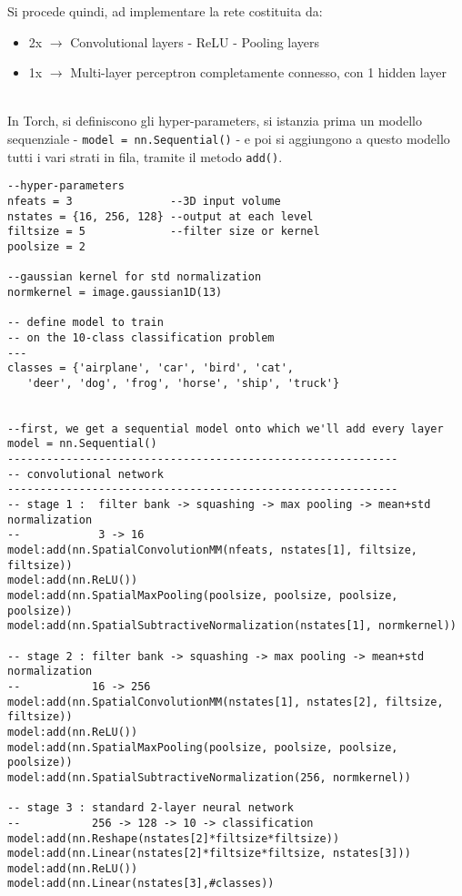 Si procede quindi, ad implementare la rete costituita da: 
\begin{itemize}
\item 2x $\rightarrow$ Convolutional layers - ReLU - Pooling layers
\item 1x $\rightarrow$ Multi-layer perceptron completamente connesso, con 1 hidden layer 
\end{itemize}
\\
In Torch, si definiscono gli hyper-parameters, si istanzia prima un modello sequenziale - \texttt{model = nn.Sequential()} - e poi si aggiungono a questo modello tutti i vari strati in fila, tramite il metodo \texttt{add()}.
\begin{lstlisting}[language={[5.2]Lua}]
--hyper-parameters
nfeats = 3               --3D input volume
nstates = {16, 256, 128} --output at each level
filtsize = 5             --filter size or kernel
poolsize = 2

--gaussian kernel for std normalization 
normkernel = image.gaussian1D(13)

-- define model to train
-- on the 10-class classification problem
---
classes = {'airplane', 'car', 'bird', 'cat',
   'deer', 'dog', 'frog', 'horse', 'ship', 'truck'}


--first, we get a sequential model onto which we'll add every layer
model = nn.Sequential()
------------------------------------------------------------
-- convolutional network
------------------------------------------------------------
-- stage 1 :  filter bank -> squashing -> max pooling -> mean+std normalization
--            3 -> 16
model:add(nn.SpatialConvolutionMM(nfeats, nstates[1], filtsize, filtsize))
model:add(nn.ReLU())
model:add(nn.SpatialMaxPooling(poolsize, poolsize, poolsize, poolsize))
model:add(nn.SpatialSubtractiveNormalization(nstates[1], normkernel))

-- stage 2 : filter bank -> squashing -> max pooling -> mean+std normalization
--           16 -> 256
model:add(nn.SpatialConvolutionMM(nstates[1], nstates[2], filtsize, filtsize))
model:add(nn.ReLU())
model:add(nn.SpatialMaxPooling(poolsize, poolsize, poolsize, poolsize))
model:add(nn.SpatialSubtractiveNormalization(256, normkernel))

-- stage 3 : standard 2-layer neural network
--           256 -> 128 -> 10 -> classification
model:add(nn.Reshape(nstates[2]*filtsize*filtsize))
model:add(nn.Linear(nstates[2]*filtsize*filtsize, nstates[3]))
model:add(nn.ReLU())
model:add(nn.Linear(nstates[3],#classes))
\end{lstlisting}

